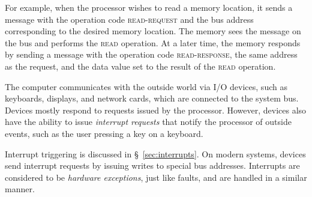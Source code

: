 For example, when the processor wishes to read a memory location, it sends a
message with the operation code \textsc{read-request} and the bus address
corresponding to the desired memory location. The memory sees the message on
the bus and performs the \textsc{read} operation. At a later time, the memory
responds by sending a message with the operation code \textsc{read-response},
the same address as the request, and the data value set to the result of the
\textsc{read} operation.

The computer communicates with the outside world via I/O devices, such as
keyboards, displays, and network cards, which are connected to the system bus.
Devices mostly respond to requests issued by the processor. However, devices
also have the ability to issue \textit{interrupt requests} that notify the
processor of outside events, such as the user pressing a key on a keyboard.

Interrupt triggering is discussed in \S~\ref{sec:interrupts}. On modern
systems, devices send interrupt requests by issuing writes to special bus
addresses. Interrupts are considered to be \textit{hardware exceptions}, just
like faults, and are handled in a similar manner.

